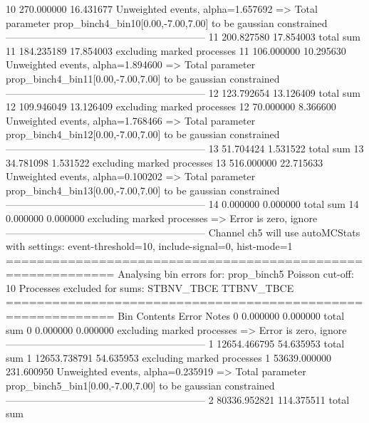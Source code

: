 10         270.000000      16.431677       Unweighted events, alpha=1.657692
  => Total parameter prop_binch4_bin10[0.00,-7.00,7.00] to be gaussian constrained
------------------------------------------------------------
11         200.827580      17.854003       total sum                     
11         184.235189      17.854003       excluding marked processes    
11         106.000000      10.295630       Unweighted events, alpha=1.894600
  => Total parameter prop_binch4_bin11[0.00,-7.00,7.00] to be gaussian constrained
------------------------------------------------------------
12         123.792654      13.126409       total sum                     
12         109.946049      13.126409       excluding marked processes    
12         70.000000       8.366600        Unweighted events, alpha=1.768466
  => Total parameter prop_binch4_bin12[0.00,-7.00,7.00] to be gaussian constrained
------------------------------------------------------------
13         51.704424       1.531522        total sum                     
13         34.781098       1.531522        excluding marked processes    
13         516.000000      22.715633       Unweighted events, alpha=0.100202
  => Total parameter prop_binch4_bin13[0.00,-7.00,7.00] to be gaussian constrained
------------------------------------------------------------
14         0.000000        0.000000        total sum                     
14         0.000000        0.000000        excluding marked processes    
  => Error is zero, ignore      
------------------------------------------------------------
Channel ch5 will use autoMCStats with settings: event-threshold=10, include-signal=0, hist-mode=1
============================================================
Analysing bin errors for: prop_binch5
Poisson cut-off: 10
Processes excluded for sums: STBNV_TBCE TTBNV_TBCE
============================================================
Bin        Contents        Error           Notes                         
0          0.000000        0.000000        total sum                     
0          0.000000        0.000000        excluding marked processes    
  => Error is zero, ignore      
------------------------------------------------------------
1          12654.466795    54.635953       total sum                     
1          12653.738791    54.635953       excluding marked processes    
1          53639.000000    231.600950      Unweighted events, alpha=0.235919
  => Total parameter prop_binch5_bin1[0.00,-7.00,7.00] to be gaussian constrained
------------------------------------------------------------
2          80336.952821    114.375511      total sum                     
